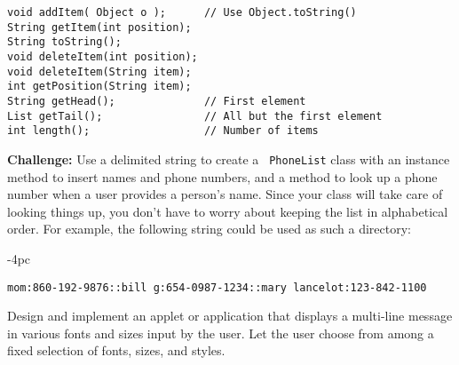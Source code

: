 \begin{EXRtwo}
\begin{jjjlisting}
\begin{lstlisting}
void addItem( Object o );      // Use Object.toString()
String getItem(int position);
String toString();
void deleteItem(int position);
void deleteItem(String item);
int getPosition(String item);
String getHead();              // First element
List getTail();                // All but the first element
int length();                  // Number of items
\end{lstlisting}
\end{jjjlisting}

\item {\bf Challenge:} Use a delimited string to create a {\tt
PhoneList} class with an instance method to insert names and phone
numbers, and a method to look up a phone number when a user provides a
person's name.  Since your class will take care of looking things up,
you don't have to worry about keeping the list in alphabetical order.
For example, the following string could be used as such a directory:

\begin{jjjlistingleft}[30pc]{-4pc}
\begin{lstlisting}
mom:860-192-9876::bill g:654-0987-1234::mary lancelot:123-842-1100
\end{lstlisting}
\end{jjjlistingleft}

\item  Design and implement an applet or application that
displays a multi-line message in various fonts and sizes input by the
user.   Let the user choose from among a fixed selection of fonts,
sizes, and styles.




\end{EXRtwo}

